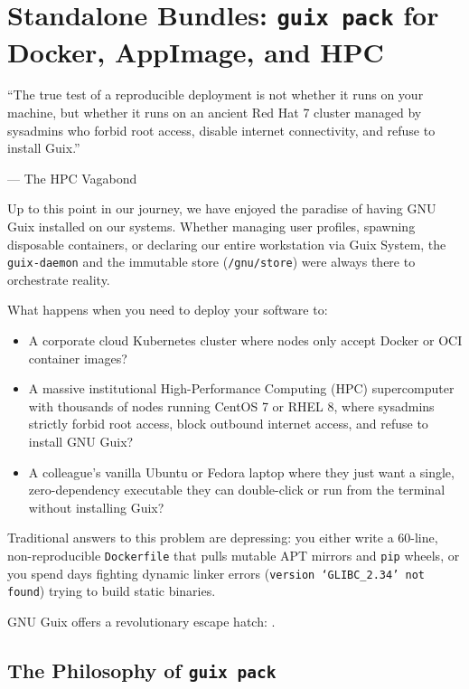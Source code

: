 \chapter{Standalone Bundles: \texttt{guix pack} for Docker, AppImage, and HPC}
\label{chap:guix-pack}

\epigraph{``The true test of a reproducible deployment is not whether it runs on your machine, but whether it runs on an ancient Red Hat 7 cluster managed by sysadmins who forbid root access, disable internet connectivity, and refuse to install Guix.''}{--- The HPC Vagabond}

\noindent
Up to this point in our journey, we have enjoyed the paradise of having GNU Guix installed on our systems. Whether managing user profiles, spawning disposable  containers, or declaring our entire workstation via Guix System, the \texttt{guix-daemon} and the immutable store (\texttt{/gnu/store}) were always there to orchestrate reality.

\begin{tearsbox}
What happens when you need to deploy your software to:
\begin{itemize}
  \item A corporate cloud Kubernetes cluster where nodes only accept Docker or OCI container images?
  \item A massive institutional High-Performance Computing (HPC) supercomputer with thousands of nodes running CentOS 7 or RHEL 8, where sysadmins strictly forbid root access, block outbound internet access, and refuse to install GNU Guix?
  \item A colleague's vanilla Ubuntu or Fedora laptop where they just want a single, zero-dependency executable they can double-click or run from the terminal without installing Guix?
\end{itemize}
\end{tearsbox}

Traditional answers to this problem are depressing: you either write a 60-line, non-reproducible \texttt{Dockerfile} that pulls mutable APT mirrors and \texttt{pip} wheels, or you spend days fighting dynamic linker errors (\texttt{version `GLIBC\_2.34' not found}) trying to build static binaries.

GNU Guix offers a revolutionary escape hatch: .

\section{The Philosophy of \texttt{guix pack}}

